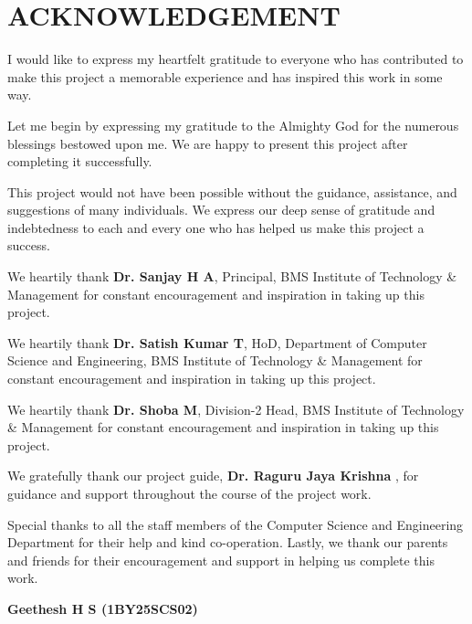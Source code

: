 \documentclass[12pt, a4paper]{report}
\newcommand{\studentOne}{Geethesh H S (1BY25SCS02)}
\newcommand{\guideName}{Dr. Raguru Jaya Krishna }
\newcommand{\clusterHeadName}{Dr. Shoba M}
\newcommand{\hodName}{Dr. Satish Kumar T}
\newcommand{\principalName}{Dr. Sanjay H A}
\begin{document}
\newpage
\chapter*{ACKNOWLEDGEMENT}
\thispagestyle{empty}

\indent I would like to express my heartfelt gratitude to everyone who has contributed to make this project a memorable experience and has inspired this work in some way.

Let me begin by expressing my gratitude to the Almighty God for the numerous blessings bestowed upon me. We are happy to present this project after completing it successfully.

This project would not have been possible without the guidance, assistance, and suggestions of many individuals. We express our deep sense of gratitude and indebtedness to each and every one who has helped us make this project a success.

We heartily thank \textbf{\principalName}, Principal, BMS Institute of Technology \& Management for constant encouragement and inspiration in taking up this project.

We heartily thank \textbf{\hodName}, HoD, Department of Computer Science and Engineering, BMS Institute of Technology \& Management for constant encouragement and inspiration in taking up this project.

We heartily thank \textbf{\clusterHeadName}, Division-2 Head, BMS Institute of Technology \& Management for constant encouragement and inspiration in taking up this project.

We gratefully thank our project guide, \textbf{\guideName}, for guidance and support throughout the course of the project work.

Special thanks to all the staff members of the Computer Science and Engineering Department for their help and kind co-operation. Lastly, we thank our parents and friends for their encouragement and support in helping us complete this work.

\vspace{1cm}
\begin{flushright}
\textbf{\studentOne}
\end{flushright}

\newpage
\end{document}
